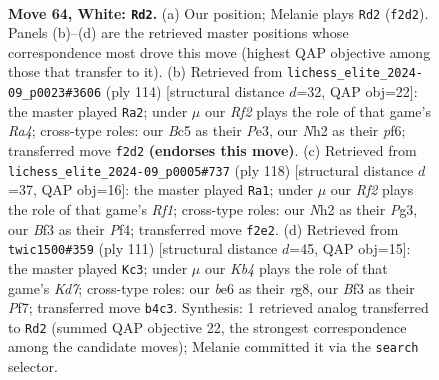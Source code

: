 \documentclass[11pt]{article}
\begin{document}
\clearpage

\begin{figure}[p]\centering
\begin{subfigure}{0.46\textwidth}\centering
\resizebox{\linewidth}{!}{%
\newchessgame
\chessboard[
  setfen={8/2k5/4b3/2B3r1/PK6/1P3B1p/5R1N/8 w - - 6 64},
  showmover=false,
  pgfstyle=straightmove, color=movearrow, markmove={f2-d2}
]}
\caption{}
\end{subfigure}\hfill
\begin{subfigure}{0.46\textwidth}\centering
\resizebox{\linewidth}{!}{%
\newchessgame
\chessboard[
  setfen={8/6pk/5p2/8/R4BP1/3rPPK1/4b3/8 w - - 2 58},
  showmover=false,
  pgfstyle=straightmove, color=movearrow, markmove={a4-a2}
]}
\caption{}
\end{subfigure}
\\[4pt]
\begin{subfigure}{0.46\textwidth}\centering
\resizebox{\linewidth}{!}{%
\newchessgame
\chessboard[
  setfen={8/5k2/8/2P5/1b1B1P2/6P1/p2r4/5RK1 w - - 1 60},
  showmover=false,
  pgfstyle=straightmove, color=movearrow, markmove={f1-a1}
]}
\caption{}
\end{subfigure}\hfill
\begin{subfigure}{0.46\textwidth}\centering
\resizebox{\linewidth}{!}{%
\newchessgame
\chessboard[
  setfen={6R1/5p2/1R2b3/4P3/4P3/3p1K2/1p1k3r/8 b - - 5 56},
  showmover=false,
  pgfstyle=straightmove, color=movearrow, markmove={d2-c3}
]}
\caption{}
\end{subfigure}
\caption{\textbf{Move 64, White: \texttt{Rd2}.} (a) Our position; Melanie plays \texttt{Rd2} (\texttt{f2d2}). Panels (b)--(d) are the retrieved master positions whose correspondence most drove this move (highest QAP objective among those that transfer to it). (b) Retrieved from \texttt{lichess\_elite\_2024-09\_p0023\#3606} (ply 114) [structural distance $d$=32, QAP obj=22]: the master played \texttt{Ra2}; under $\mu$ our \emph{Rf2} plays the role of that game's \emph{Ra4}; cross-type roles: our \emph{B}c5 as their \emph{P}e3, our \emph{N}h2 as their \emph{p}f6; transferred move \texttt{f2d2} \textbf{(endorses this move)}. (c) Retrieved from \texttt{lichess\_elite\_2024-09\_p0005\#737} (ply 118) [structural distance $d$=37, QAP obj=16]: the master played \texttt{Ra1}; under $\mu$ our \emph{Rf2} plays the role of that game's \emph{Rf1}; cross-type roles: our \emph{N}h2 as their \emph{P}g3, our \emph{B}f3 as their \emph{P}f4; transferred move \texttt{f2e2}. (d) Retrieved from \texttt{twic1500\#359} (ply 111) [structural distance $d$=45, QAP obj=15]: the master played \texttt{Kc3}; under $\mu$ our \emph{Kb4} plays the role of that game's \emph{Kd7}; cross-type roles: our \emph{b}e6 as their \emph{r}g8, our \emph{B}f3 as their \emph{P}f7; transferred move \texttt{b4c3}. Synthesis: 1 retrieved analog transferred to \texttt{Rd2} (summed QAP objective 22, the strongest correspondence among the candidate moves); Melanie committed it via the \texttt{search} selector.}
\label{fig:thought-m126}
\end{figure}
\end{document}
